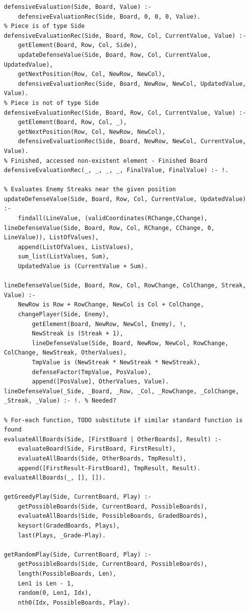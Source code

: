\documentclass[a4paper]{article}
\begin{document}
\begin{lstlisting}
defensiveEvaluation(Side, Board, Value) :-
	defensiveEvaluationRec(Side, Board, 0, 0, 0, Value).
% Piece is of type Side
defensiveEvaluationRec(Side, Board, Row, Col, CurrentValue, Value) :-
	getElement(Board, Row, Col, Side),
	updateDefenseValue(Side, Board, Row, Col, CurrentValue, UpdatedValue),
	getNextPosition(Row, Col, NewRow, NewCol),
	defensiveEvaluationRec(Side, Board, NewRow, NewCol, UpdatedValue, Value).
% Piece is not of type Side
defensiveEvaluationRec(Side, Board, Row, Col, CurrentValue, Value) :-
	getElement(Board, Row, Col, _),
	getNextPosition(Row, Col, NewRow, NewCol),
	defensiveEvaluationRec(Side, Board, NewRow, NewCol, CurrentValue, Value).
% Finished, accessed non-existent element - Finished Board
defensiveEvaluationRec(_, _, _, _, FinalValue, FinalValue) :- !.

% Evaluates Enemy Streaks near the given position
updateDefenseValue(Side, Board, Row, Col, CurrentValue, UpdatedValue) :-
	findall(LineValue, (validCoordinates(RChange,CChange), lineDefenseValue(Side, Board, Row, Col, RChange, CChange, 0, LineValue)), ListOfValues),
	append(ListOfValues, ListValues),
	sum_list(ListValues, Sum),
	UpdatedValue is (CurrentValue + Sum).

lineDefenseValue(Side, Board, Row, Col, RowChange, ColChange, Streak, Value) :-
	NewRow is Row + RowChange, NewCol is Col + ColChange,
	changePlayer(Side, Enemy),
        getElement(Board, NewRow, NewCol, Enemy), !,
        NewStreak is (Streak + 1),
        lineDefenseValue(Side, Board, NewRow, NewCol, RowChange, ColChange, NewStreak, OtherValues),
        TmpValue is (NewStreak * NewStreak * NewStreak),
        defenseFactor(TmpValue, PosValue),
        append([PosValue], OtherValues, Value).
lineDefenseValue(_Side, _Board, _Row, _Col, _RowChange, _ColChange, _Streak, _Value) :- !. % Needed?

% For-each function, TODO substitute if similar standard function is found
evaluateAllBoards(Side, [FirstBoard | OtherBoards], Result) :-
	evaluateBoard(Side, FirstBoard, FirstResult),
	evaluateAllBoards(Side, OtherBoards, TmpResult),
	append([FirstResult-FirstBoard], TmpResult, Result).
evaluateAllBoards(_, [], []).

getGreedyPlay(Side, CurrentBoard, Play) :-
	getPossibleBoards(Side, CurrentBoard, PossibleBoards),
	evaluateAllBoards(Side, PossibleBoards, GradedBoards),
	keysort(GradedBoards, Plays),
	last(Plays, _Grade-Play).

getRandomPlay(Side, CurrentBoard, Play) :-
	getPossibleBoards(Side, CurrentBoard, PossibleBoards),
	length(PossibleBoards, Len),
	Len1 is Len - 1,
	random(0, Len1, Idx),
	nth0(Idx, PossibleBoards, Play).
\end{lstlisting}
\newpage
\end{document}
